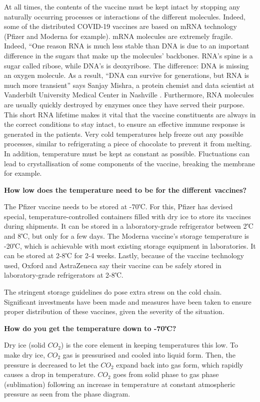 \documentclass[11pt]{report}
\begin{document}
At all times, the contents of the vaccine must be kept intact by stopping any naturally occurring processes or interactions of the different molecules. Indeed, some of the distributed COVID-19 vaccines are based on mRNA technology (Pfizer and Moderna for example). mRNA molecules are extremely fragile. Indeed, “One reason RNA is much less stable than DNA is due to an important difference in the sugars that make up the molecules’ backbones. RNA’s spine is a sugar called ribose, while DNA’s is deoxyribose. The difference: DNA is missing an oxygen molecule. As a result, “DNA can survive for generations, but RNA is much more transient” says Sanjay Mishra, a protein chemist and data scientist at Vanderbilt University Medical Center in Nashville \cite{mrna}. Furthermore, RNA molecules are usually quickly destroyed  by enzymes once they have served their purpose. This short RNA lifetime makes it vital that the vaccine constituents are always in the correct conditions to stay intact, to ensure an effective immune response is generated in the patients. Very cold temperatures help freeze out any possible processes, similar to refrigerating a piece of chocolate to prevent it from melting. 
In addition, temperature must be kept as constant as possible. Fluctuations can lead to crystallisation of some components of the vaccine, breaking the membrane for example.

\textbf{How low does the temperature need to be for the different vaccines?}

The Pfizer vaccine needs to be stored at -70℃. For this, Pfizer has devised special, temperature-controlled containers filled with dry ice to store its vaccines during shipments. It can be stored in a laboratory-grade refrigerator between 2℃ and 8℃, but only for a few days.
The Moderna vaccine’s storage temperature is -20℃, which is achievable with most existing storage equipment in laboratories. It can be stored at 2-8℃ for 2-4 weeks.
Lastly, because of the vaccine technology used, Oxford and AstraZeneca say their vaccine can be safely stored in laboratory-grade refrigerators at 2-8℃.

The stringent storage guidelines do pose extra stress on the cold chain. Significant investments have been made and measures have been taken to ensure proper distribution of these vaccines, given the severity of the situation.

\textbf{How do you get the temperature down to -70℃?}

Dry ice (solid $CO_2$) is the core element in keeping temperatures this low. To make dry ice, $CO_2$ gas is pressurised and cooled into liquid form. Then, the pressure is decreased to let the $CO_2$ expand back into gas form, which rapidly causes a drop in temperature.
$CO_2$ goes from solid phase to gas phase (sublimation) following an increase in temperature at constant atmospheric pressure as seen from the phase diagram. 
\end{document}

